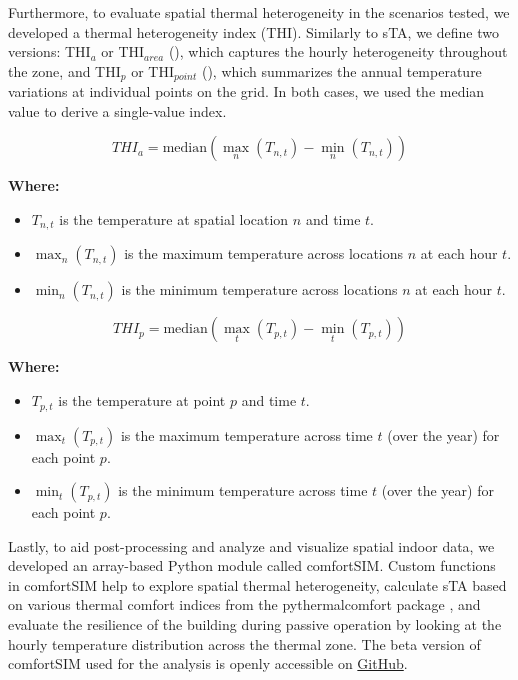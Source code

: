 Furthermore, to evaluate spatial thermal heterogeneity in the scenarios tested, we developed a thermal heterogeneity index (THI). Similarly to sTA, we define two versions: THI$_a$ or THI$_{area}$ (), which captures the hourly heterogeneity throughout the zone, and THI$_p$ or THI$_{point}$ (), which summarizes the annual temperature variations at individual points on the grid. In both cases, we used the median value to derive a single-value index.

\begin{equation}\label{eq:thi-area}
    THI_a = \text{median}\left( \max_{n}(T_{n,t}) - \min_{n}(T_{n,t}) \right)
\end{equation}

\textbf{Where:}
\begin{itemize}
    \item $T_{n,t}$ is the temperature at spatial location $n$ and time $t$.
    \item $\max_{n}(T_{n,t})$ is the maximum temperature across locations $n$ at each hour $t$.
    \item $\min_{n}(T_{n,t})$ is the minimum temperature across locations $n$ at each hour $t$.
\end{itemize}

\begin{equation}\label{eq:thi-point}
    THI_p = \text{median}\left( \max_{t}(T_{p,t}) - \min_{t}(T_{p,t}) \right)
\end{equation}

\textbf{Where:}
\begin{itemize}
    \item $T_{p,t}$ is the temperature at point $p$ and time $t$.
    \item $\max_{t}(T_{p,t})$ is the maximum temperature across time $t$ (over the year) for each point $p$.
    \item $\min_{t}(T_{p,t})$ is the minimum temperature across time $t$ (over the year) for each point $p$.
\end{itemize}

\vspace{0.25cm}

Lastly, to aid post-processing and analyze and visualize spatial indoor data, we developed an array-based Python module called comfortSIM. Custom functions in comfortSIM help to explore spatial thermal heterogeneity, calculate sTA based on various thermal comfort indices from the pythermalcomfort package \citep{tartarini_pythermalcomfort_2020}, and evaluate the resilience of the building during passive operation by looking at the hourly temperature distribution across the thermal zone. The beta version of comfortSIM used for the analysis is openly accessible on \href{https://github.com/t-kramer/comfortSIM}{GitHub}.


